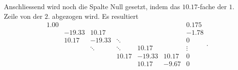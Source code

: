 Anschliessend wird noch die Spalte Null gesetzt, indem das $ 10.17 $-fache der $1$. Zeile von der $2$. abgezogen wird.
Es resultiert
\begin{equation}
    \boxed{\begin{matrix}
         1.00  &        &        &        &        &        & 0.175 \\
               &-19.33  & 10.17  &        &        &        & -1.78 \\
               & 10.17  &-19.33  & \ddots &        &        & 0 \\
               &        & \ddots & \ddots & 10.17  &        & \vdots \\
               &        &        & 10.17  &-19.33  & 10.17  & 0 \\
               &        &        &        & 10.17  & -9.67  & 0 
    \end{matrix}}.
\end{equation}

